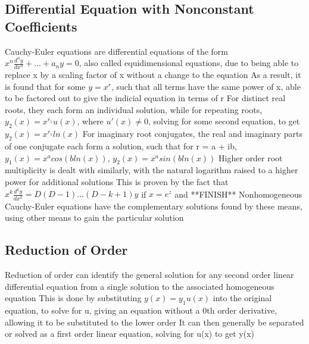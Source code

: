 \documentclass[11 pt, twoside]{article}
\newenvironment{outline*}
{
	\begin{outline}[enumerate]
	}
	{\end{outline}
}
\begin{document}
\subsection{Differential Equation with Nonconstant Coefficients}
\begin{outline*}
\1 Cauchy-Euler equations are differential equations of the form $x^n\frac{d^ny}{dx^n} + ... + a_ny = 0$, also called equidimensional equations, due to being able to replace x by a scaling factor of x without a change to the equation
\2 As a result, it is found that for some $y = x^r$, such that all terms have the same power of x, able to be factored out to give the indicial equation in terms of r
\2 For distinct real roots, they each form an individual solution, while for repeating roots, $y_2(x) = x^{r_1}u(x)$, where $u'(x) \neq 0$, solving for some second equation, to get $y_2(x) = x^{r_1}ln(x)$
\3 For imaginary root conjugates, the real and imaginary parts of one conjugate each form a solution, such that for r = a + ib, $y_1(x) = x^a cos(b ln(x))$, $y_2(x) = x^a sin(b ln(x))$
\2 Higher order root multiplicity is dealt with similarly, with the natural logarithm raised to a higher power for additional solutions
\3 This is proven by the fact that $x^k\frac{d^ky}{dx^k} = D(D-1)...(D-k+1)y$ if $x = e^z$ and **FINISH**
\1 Nonhomogeneous Cauchy-Euler equations have the complementary solutions found by these means, using other means to gain the particular solution
\end{outline*}
\subsection{Reduction of Order}
\begin{outline*}
\1 Reduction of order can identify the general solution for any second order linear differential equation from a single solution to the associated homogeneous equation
\2 This is done by substituting $y(x) = y_1u(x)$ into the original equation, to solve for u, giving an equation without a 0th order derivative, allowing it to be substituted to the lower order
\2 It can then generally be separated or solved as a first order linear equation, solving for u(x) to get y(x)
\end{outline*}
\end{document}
